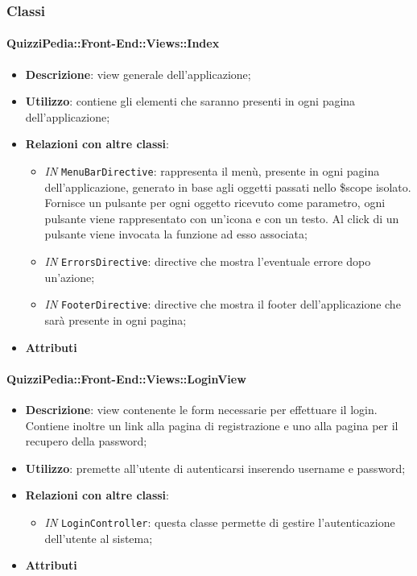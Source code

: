 \subsubsection{Classi}

\paragraph{QuizziPedia::Front-End::Views::Index}
\begin{itemize}
	\item \textbf{Descrizione}:  view generale dell'applicazione;
	\item \textbf{Utilizzo}: contiene gli elementi che saranno presenti in ogni pagina dell'applicazione;
	\item \textbf{Relazioni con altre classi}:
	\begin{itemize}
		\item \textit{IN} \texttt{MenuBarDirective}: rappresenta il menù, presente in ogni pagina dell'applicazione, generato in base agli oggetti passati nello \$scope isolato. Fornisce un pulsante per ogni oggetto ricevuto come parametro, ogni pulsante viene rappresentato con un’icona e con un testo. Al click di un pulsante viene invocata la funzione ad esso associata;
		\item \textit{IN} \texttt{ErrorsDirective}: directive che mostra l'eventuale errore dopo un'azione;
		\item \textit{IN} \texttt{FooterDirective}: directive che mostra il footer dell'applicazione che sarà presente in ogni pagina;
	\end{itemize}
	\item \textbf{Attributi}
\end{itemize}

\paragraph{QuizziPedia::Front-End::Views::LoginView}
\begin{itemize}
	\item \textbf{Descrizione}: view contenente le form necessarie per effettuare il login. Contiene inoltre un link alla pagina di registrazione e uno alla pagina per il recupero della password;
	\item \textbf{Utilizzo}: premette all'utente di autenticarsi inserendo username e password;
	\item \textbf{Relazioni con altre classi}:
	\begin{itemize}
		\item \textit{IN} \texttt{LoginController}: questa classe permette di gestire l'autenticazione dell'utente al sistema;
	\end{itemize}
	\item \textbf{Attributi}
\end{itemize}

